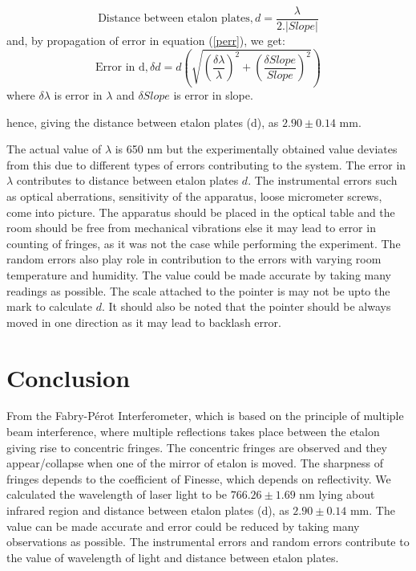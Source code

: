\documentclass[a4paper, amsfonts, amssymb, amsmath, reprint, showkeys, nofootinbib, twoside]{revtex4-1}
\begin{document}
\begin{equation}\label{perr}
\text{Distance between etalon plates}, d =\frac{\lambda}{2.|Slope|}
\end{equation}
and, by propagation of error in equation (\ref{perr}), we get:
\begin{equation}
\text{Error in d}, \delta d=d\left(\sqrt{\left(\frac{\delta \lambda}{\lambda}\right)^2+\left(\frac{\delta Slope}{Slope}\right)^2}\right)
\end{equation}
where $\delta \lambda$ is error in $\lambda$ and $\delta Slope$ is error in slope.

hence, giving the distance between etalon plates (d), as $2.90\pm 0.14$ mm.

The actual value of $\lambda$ is 650 nm but the experimentally obtained value deviates from this due to different types of errors contributing to the system. The error in $\lambda$ contributes to distance between etalon plates $d$. The instrumental errors such as optical aberrations, sensitivity of the apparatus, loose micrometer screws,  come into picture. The apparatus should be placed in the optical table and the room should be free from mechanical vibrations else it may lead to error in counting of fringes, as it was not the case while performing the experiment. The random errors also play role in contribution to the errors with varying room temperature and humidity. The value could be made accurate by taking many readings as possible. The scale attached to the pointer is may not be upto the mark to calculate $d$. It should also be noted that the pointer should be always moved in one direction as it may lead to backlash error.

\section{Conclusion}
From the Fabry-Pérot Interferometer, which is based on the principle of multiple beam interference, where multiple reflections takes place between the etalon giving rise to concentric fringes. The concentric fringes are observed and they appear/collapse when one of the mirror of etalon is moved. The sharpness of fringes depends to the coefficient of Finesse, which depends on reflectivity. We calculated the wavelength of laser light to be $766.26\pm1.69$ nm lying about infrared region and distance between etalon plates (d), as $2.90\pm 0.14$ mm. The value can be made accurate and error could be reduced by taking many observations as possible. The instrumental errors and random errors contribute to the value of wavelength of light and distance between etalon plates. 
\end{document}
